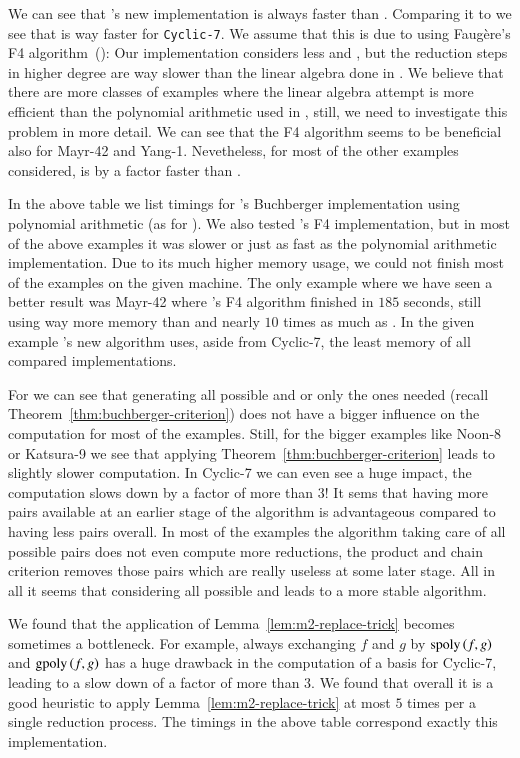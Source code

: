 We can see that \singular's new implementation is always faster than \macaulay.
Comparing it to \magma we see that \magma is way faster for \texttt{Cyclic-7}.
We assume that this is due to \magma using Faug\`ere's F4
algorithm~(\cite{fF41999}): Our implementation considers less \spts and \gpts, but
the reduction steps in higher degree are way slower than the linear algebra done
in \magma. We believe that there are more classes of examples where the linear
algebra attempt is more efficient than the polynomial arithmetic used in
\singular, still, we need to investigate this problem in more detail. We can see
that the F4 algorithm seems to be beneficial also for Mayr-42 and Yang-1.
Nevetheless, for most of the other examples considered, \singular is by a
factor faster than \magma.

In the above table we list timings for \macaulay's Buchberger implementation
using polynomial arithmetic (as for \singular).
We also tested \macaulay's F4 implementation, but in most of the above examples
it was slower or just as fast as the polynomial arithmetic implementation. Due
to its much higher memory usage, we could not finish most of the examples on the
given machine. The only example where we have seen a better result was Mayr-42
where \macaulay's F4 algorithm finished in $185$ seconds, still using way more
memory than \magma and nearly $10$ times as much as \singular. In the given
example \singular's new algorithm uses, aside from Cyclic-7, the least memory
of all compared implementations.

For \singular we can see that generating all possible \spts and \gpts or only
the ones needed (recall Theorem~\ref{thm:buchberger-criterion}) does not have a
bigger influence on the computation for most of the examples.
Still, for the bigger examples like Noon-8 or Katsura-9 we see that applying
Theorem~\ref{thm:buchberger-criterion} leads to slightly slower computation. In
Cyclic-7 we can even see a huge impact, the computation slows down by a factor
of more than $3$! It sems that having more pairs available at an earlier stage
of the algorithm is advantageous compared to having less pairs overall. In most
of the examples the algorithm taking care of all possible pairs does not even
compute more reductions, the product and chain criterion removes those
pairs which are really useless at some later stage. All in all it seems that
considering all possible \spts and \gpts leads to a more stable algorithm.

We found that the application of Lemma~\ref{lem:m2-replace-trick} becomes
sometimes a bottleneck. For example, always exchanging $f$ and $g$ by $\mathrm{spoly}\left({f},{g}\right)$ and $\mathrm{gpoly}\left({f},{g}\right)$ has a huge drawback in the computation of a basis for
Cyclic-7, leading to a slow down of a factor of more than $3$. We found
that overall it is a good heuristic to apply Lemma~\ref{lem:m2-replace-trick} at
most $5$ times per a single reduction process. The \singular timings in the
above table correspond exactly this implementation.
